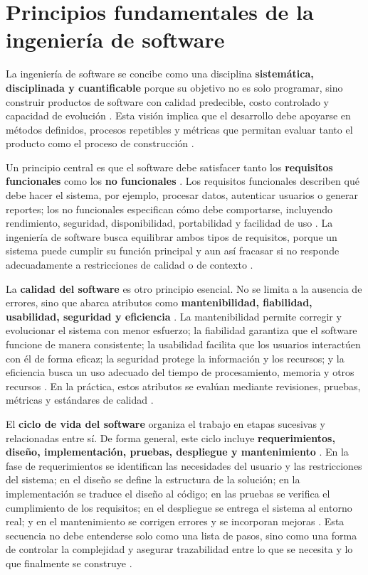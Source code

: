 \section{Principios fundamentales de la ingeniería de software}

La ingeniería de software se concibe como una disciplina \textbf{sistemática, disciplinada y cuantificable} porque su objetivo no es solo programar, sino construir productos de software con calidad predecible, costo controlado y capacidad de evolución \cite{sommerville2016}. Esta visión implica que el desarrollo debe apoyarse en métodos definidos, procesos repetibles y métricas que permitan evaluar tanto el producto como el proceso de construcción \cite{pressman2020}.

Un principio central es que el software debe satisfacer tanto los \textbf{requisitos funcionales} como los \textbf{no funcionales} \cite{sommerville2016}. Los requisitos funcionales describen qué debe hacer el sistema, por ejemplo, procesar datos, autenticar usuarios o generar reportes; los no funcionales especifican cómo debe comportarse, incluyendo rendimiento, seguridad, disponibilidad, portabilidad y facilidad de uso \cite{pressman2020}. La ingeniería de software busca equilibrar ambos tipos de requisitos, porque un sistema puede cumplir su función principal y aun así fracasar si no responde adecuadamente a restricciones de calidad o de contexto \cite{sommerville2016}.

La \textbf{calidad del software} es otro principio esencial. No se limita a la ausencia de errores, sino que abarca atributos como \textbf{mantenibilidad, fiabilidad, usabilidad, seguridad y eficiencia} \cite{iso12207}. La mantenibilidad permite corregir y evolucionar el sistema con menor esfuerzo; la fiabilidad garantiza que el software funcione de manera consistente; la usabilidad facilita que los usuarios interactúen con él de forma eficaz; la seguridad protege la información y los recursos; y la eficiencia busca un uso adecuado del tiempo de procesamiento, memoria y otros recursos \cite{iso12207, pressman2020}. En la práctica, estos atributos se evalúan mediante revisiones, pruebas, métricas y estándares de calidad \cite{sommerville2016}.

El \textbf{ciclo de vida del software} organiza el trabajo en etapas sucesivas y relacionadas entre sí. De forma general, este ciclo incluye \textbf{requerimientos, diseño, implementación, pruebas, despliegue y mantenimiento} \cite{pressman2020}. En la fase de requerimientos se identifican las necesidades del usuario y las restricciones del sistema; en el diseño se define la estructura de la solución; en la implementación se traduce el diseño al código; en las pruebas se verifica el cumplimiento de los requisitos; en el despliegue se entrega el sistema al entorno real; y en el mantenimiento se corrigen errores y se incorporan mejoras \cite{sommerville2016}. Esta secuencia no debe entenderse solo como una lista de pasos, sino como una forma de controlar la complejidad y asegurar trazabilidad entre lo que se necesita y lo que finalmente se construye \cite{pressman2020}.

